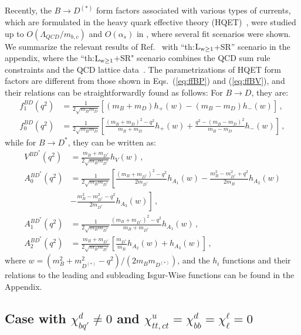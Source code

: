 \documentclass[prd,preprint,superscriptaddress,amsmath,amssymb]{revtex4}
\begin{document}
  
 Recently, the $B\to D^{(*)}$ form factors associated with various types of currents, which are formulated in the heavy quark effective theory (HQET)~\cite{Falk:1992wt}, were studied up to $O(\Lambda_{QCD}/m_{b,c})$ and $O(\alpha_s)$ in \cite{Bernlochner:2017jka}, where several fit scenarios were shown. We summarize the relevant results of Ref.~\cite{Bernlochner:2017jka} with ``th:$\rm L_{w\geq 1}$+SR''  scenario in the appendix, where the ``th:$\rm L_{w\geq 1}$+SR" scenario combines the QCD sum rule constraints and the QCD lattice data~\cite{Lattice:2015rga}.  The parametrizations of HQET form factors are different from those shown in Eqs.~(\ref{eq:ffBP}) and (\ref{eq:ffBV}), and their relations can be straightforwardly found as follows: For $B\to D$, they are:
  \begin{align}
  f^{BD}_1 (q^2) & = \frac{1}{2\sqrt{m_B m_D}} \left[ (m_B + m_D) h_+ (w) - (m_B - m_D) h_{-}(w)\right]\,, \nonumber \\
  f^{BD}_0(q^2) & = \frac{1}{2\sqrt{m_B m_D}} \left[ \frac{(m_B + m_D)^2-q^2}{m_B + m_D} h_{+}(w) + \frac{q^2- (m_B-m_D)^2}{m_B-m_D} h_{-}(w)\right]\,,
  \end{align}
   while for $B\to D^*$, they can be written as:
   \begin{align}
   V^{BD^*}(q^2) & = \frac{m_B + m_{D^*} }{ 2\sqrt{m_B m_{D^*} }} h_V(w)\,,  \nonumber \\
   A^{BD^*}_0(q^2) & = \frac{1}{2\sqrt{m_B m_{D^*}}} \left[ \frac{(m_B + m_{D^*})^2-q^2}{2m_{D^*}} h_{A_1}(w) 
   -\frac{m^2_B -m^2_{D^*} + q^2}{2 m_B} h_{A_2}(w) \right. \nonumber \\
   & \left. -\frac{m^2_B -m^2_{D^*} -q^2 }{2m_{D^*}} h_{A_3} (w)
   \right]\,, \nonumber \\
   A^{BD^*}_1(q^2) & =\frac{1}{2\sqrt{m_B m_{D^*}}} \frac{(m_B + m_{D^*})^2 - q^2}{m_B + m_{D^*}}h_{A_1} (w)\,, \nonumber \\
    A^{BD^*}_2(q^2) & = \frac{m_B + m_{D^*}}{2\sqrt{m_B m_{D^*} }} \left[ \frac{m_{D^*}}{m_B} h_{A_2} (w) + h_{A_3} (w) \right]\,,
   \end{align}
  where $w=(m^2_B + m^2_{D^{(*)}} -q^2 )/(2m_B m_{D^{(*)}})$, and  the $h_i$ functions and their relations to the leading and subleading Isgur-Wise functions can be found in the Appendix. 
  
  
  \subsection{ Case with $\chi^d_{bq'}\neq 0$ and $\chi^{u}_{tt,ct}=\chi^d_{bb}=\chi^\ell_\ell=0$}
  
\end{document}
